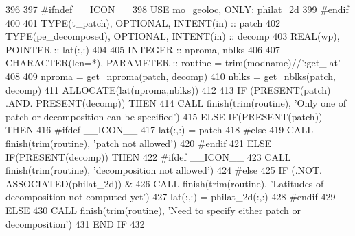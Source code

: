 \begin{DoxyCode}
396 
397 \textcolor{preprocessor}{#ifndef \_\_ICON\_\_}
398 \textcolor{preprocessor}{}    \textcolor{keywordtype}{USE }mo\_geoloc\textcolor{keywordtype}{, ONLY}: philat\_2d
399 \textcolor{preprocessor}{#endif}
400 \textcolor{preprocessor}{}
401     \textcolor{keywordtype}{TYPE}(t\_patch),       \textcolor{keywordtype}{OPTIONAL}, \textcolor{keywordtype}{INTENT(in)}  :: patch
402     \textcolor{keywordtype}{TYPE}(pe\_decomposed), \textcolor{keywordtype}{OPTIONAL}, \textcolor{keywordtype}{INTENT(in)}  :: decomp
403     \textcolor{keywordtype}{REAL(wp)}, \textcolor{keywordtype}{POINTER}                          :: lat(:,:)
404 
405     \textcolor{keywordtype}{INTEGER} :: nproma, nblks
406 
407     \textcolor{keywordtype}{CHARACTER(len=*)}, \textcolor{keywordtype}{PARAMETER} :: routine = trim(modname)//\textcolor{stringliteral}{':get\_lat'}
408 
409     nproma = get\_nproma(patch, decomp)
410     nblks  = get\_nblks(patch, decomp)
411     \textcolor{keyword}{ALLOCATE}(lat(nproma,nblks))
412 
413     \textcolor{keywordflow}{IF} (\textcolor{keyword}{PRESENT}(patch) .AND. \textcolor{keyword}{PRESENT}(decomp)) \textcolor{keywordflow}{THEN}
414       \textcolor{keyword}{CALL }finish(trim(routine), \textcolor{stringliteral}{'Only one of patch or decomposition can be specified'})
415     \textcolor{keywordflow}{ELSE} \textcolor{keywordflow}{IF}(\textcolor{keyword}{PRESENT}(patch)) \textcolor{keywordflow}{THEN}
416 \textcolor{preprocessor}{#ifdef \_\_ICON\_\_}
417 \textcolor{preprocessor}{}      lat(:,:) = patch%
418 \textcolor{preprocessor}{#else}
419 \textcolor{preprocessor}{}      \textcolor{keyword}{CALL }finish(trim(routine), \textcolor{stringliteral}{'patch not allowed'})
420 \textcolor{preprocessor}{#endif}
421 \textcolor{preprocessor}{}    \textcolor{keywordflow}{ELSE} \textcolor{keywordflow}{IF}(\textcolor{keyword}{PRESENT}(decomp)) \textcolor{keywordflow}{THEN}
422 \textcolor{preprocessor}{#ifdef \_\_ICON\_\_}
423 \textcolor{preprocessor}{}      \textcolor{keyword}{CALL }finish(trim(routine), \textcolor{stringliteral}{'decomposition not allowed'})
424 \textcolor{preprocessor}{#else}
425 \textcolor{preprocessor}{}      \textcolor{keywordflow}{IF} (.NOT. \textcolor{keyword}{ASSOCIATED}(philat\_2d)) &
426         \textcolor{keyword}{CALL }finish(trim(routine), \textcolor{stringliteral}{'Latitudes of decomposition not computed yet'})
427       lat(:,:) = philat\_2d(:,:)
428 \textcolor{preprocessor}{#endif}
429 \textcolor{preprocessor}{}    \textcolor{keywordflow}{ELSE}
430       \textcolor{keyword}{CALL }finish(trim(routine), \textcolor{stringliteral}{'Need to specify either patch or decomposition'})
431 \textcolor{keywordflow}{    END IF}
432 
\end{DoxyCode}


